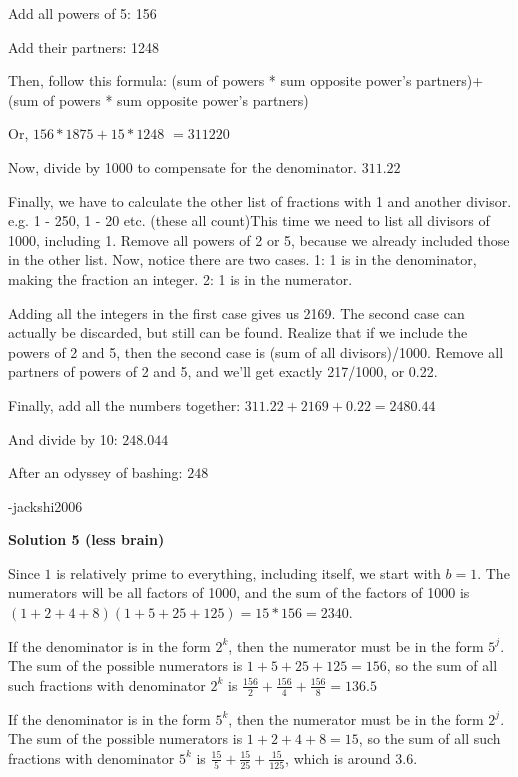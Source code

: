 \begin{enumerate}
 Add all powers of 5: 156

 Add their partners: 1248

 
Then, follow this formula: (sum of powers * sum opposite power's partners)+(sum of powers * sum opposite power's partners)

 Or, $156*1875+15*1248$ $=311220$

 Now, divide by 1000 to compensate for the denominator. $311.22$

 
Finally, we have to calculate the other list of fractions with 1 and another divisor. e.g. 1 - 250, 1 - 20 etc. (these all count)This time we need to list all divisors of 1000, including 1. Remove all powers of 2 or 5, because we already included those in the other list. Now, notice there are two cases. 1: 1 is in the denominator, making the fraction an integer. 2: 1 is in the numerator.

 Adding all the integers in the first case gives us 2169. The second case can actually be discarded, but still can be found. Realize that if we include the powers of 2 and 5, then the second case is (sum of all divisors)/1000. Remove all partners of powers of 2 and 5, and we'll get exactly 217/1000, or 0.22.

 
Finally, add all the numbers together: $311.22 +  2169 + 0.22 = 2480.44$

 And divide by 10: $248.044$

 After an odyssey of bashing: $\boxed{248}$

 
-jackshi2006

 



\textbf{Solution 5 (less brain)}

Since $1$ is relatively prime to everything, including itself, we start with $b=1$. The numerators will be all factors of 1000, and the sum of the factors of 1000 is $(1+2+4+8)(1+5+25+125) = 15*156=2340$.

 
If the denominator is in the form $2^k$, then the numerator must be in the form $5^j$. The sum of the possible numerators is $1+5+25+125 = 156$, so the sum of all such fractions with denominator $2^k$ is $\frac{156}{2}+\frac{156}{4}+\frac{156}{8} = 136.5$

 
If the denominator is in the form $5^k$, then the numerator must be in the form $2^j$. The sum of the possible numerators is $1+2+4+8 =15$, so the sum of all such fractions with denominator $5^k$ is $\frac{15}{5}+\frac{15}{25}+\frac{15}{125}$, which is around $3.6$.


\end{enumerate}
